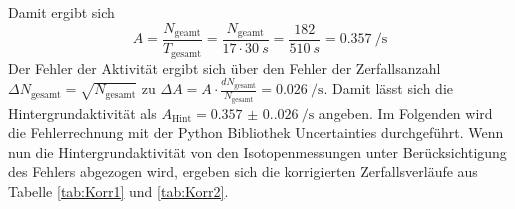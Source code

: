 Damit ergibt sich 
\begin{equation*}
  A=\frac{N_\text{geamt}}{T_\text{gesamt}}=\frac{N_\text{geamt}}{17\cdot \qty{30}{s}}=\frac{182}{\qty{510}{s}}=\qty{0.357}{\per\s}
\end{equation*}
Der Fehler der Aktivität ergibt sich über den Fehler der Zerfallsanzahl $\Delta N_\text{gesamt}=\sqrt{N_\text{gesamt}}$ zu $\Delta A=A\cdot \frac{dN_\text{gesamt}}{N_\text{gesamt}}=\qty{0.026}{\per\s}$.
Damit lässt sich die Hintergrundaktivität als $A_\text{Hint}=\qty{0.357(0.026)}{\per\s}$ angeben.
Im Folgenden wird die Fehlerrechnung mit der Python Bibliothek Uncertainties \cite{uncertainties} durchgeführt.
Wenn nun die Hintergrundaktivität von den Isotopenmessungen unter Berücksichtigung des Fehlers abgezogen wird,
ergeben sich die korrigierten Zerfallsverläufe aus Tabelle \ref{tab:Korr1} und \ref{tab:Korr2}.
